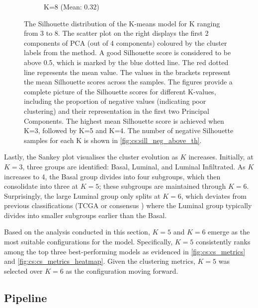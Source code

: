 \begin{figure}[!t]
\begin{subfigure}[!t]{0.49\textwidth}
        \caption{K=8 (Mean: $0.32$)}
    \end{subfigure}
    \centering
    \caption[Silhouette distribution a further exploration of K-means]{The Silhouette distribution of the K-means model for K ranging from 3 to 8. The scatter plot on the right displays the first 2 components of PCA (out of 4 components) coloured by the cluster labels from the method. A good Silhouette score is considered to be above 0.5, which is marked by the blue dotted line. The red dotted line represents the mean value. The values in the brackets represent the mean Silhouette scores across the samples. The figures provide a complete picture of the Silhouette scores for different K-values, including the proportion of negative values (indicating poor clustering) and their representation in the first two Principal Components. The highest mean Silhouette score is achieved when K=3, followed by K=5 and K=4. The number of negative Silhouette samples for each K is shown in \cref{fig:cs:sill_neg_above_th}.}
    \label{fig:cs:sill_distrib}
\end{figure}

Lastly, the Sankey plot visualises the cluster evolution as $K$ increases. Initially, at $K=3$, three groups are identified: Basal, Luminal, and Luminal Infiltrated. As $K$ increases to 4, the Basal group divides into four subgroups, which then consolidate into three at $K=5$; these subgroups are maintained through $K=6$. Surprisingly, the large Luminal group only splits at $K=6$, which deviates from previous classifications (TCGA or consensus \citet{Robertson2017-mg, Kamoun2020-tj}) where the Luminal group typically divides into smaller subgroups earlier than the Basal.

Based on the analysis conducted in this section, $K=5$ and $K=6$ emerge as the most suitable configurations for the model. Specifically, $K=5$ consistently ranks among the top three best-performing models as evidenced in \cref{fig:cs:cs_metrics} and \cref{fig:cs:cs_metrics_heatmap}. Given the clustering metrics, $K=5$ was selected over $K=6$ as the configuration moving forward.





\subsection{Pipeline}

